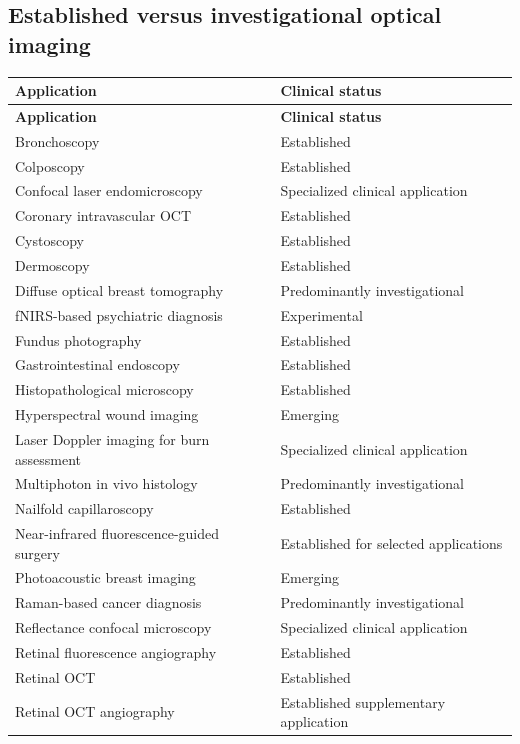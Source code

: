 \subsection{Established versus investigational optical imaging}
\begin{longtable}{@{}p{}p{}@{}}
\toprule
\textbf{Application} & \textbf{Clinical status} \\
\midrule
\endfirsthead
\toprule
\textbf{Application} & \textbf{Clinical status} \\
\midrule
\endhead
Bronchoscopy & Established \\
Colposcopy & Established \\
Confocal laser endomicroscopy & Specialized clinical application \\
Coronary intravascular OCT & Established \\
Cystoscopy & Established \\
Dermoscopy & Established \\
Diffuse optical breast tomography & Predominantly investigational \\
fNIRS-based psychiatric diagnosis & Experimental \\
Fundus photography & Established \\
Gastrointestinal endoscopy & Established \\
Histopathological microscopy & Established \\
Hyperspectral wound imaging & Emerging \\
Laser Doppler imaging for burn assessment & Specialized clinical application \\
Multiphoton in vivo histology & Predominantly investigational \\
Nailfold capillaroscopy & Established \\
Near-infrared fluorescence-guided surgery & Established for selected applications \\
Photoacoustic breast imaging & Emerging \\
Raman-based cancer diagnosis & Predominantly investigational \\
Reflectance confocal microscopy & Specialized clinical application \\
Retinal fluorescence angiography & Established \\
Retinal OCT & Established \\
Retinal OCT angiography & Established supplementary application \\
\bottomrule
\end{longtable}

